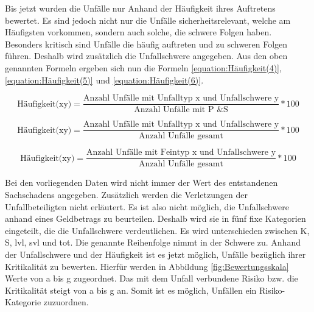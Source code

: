 Bis jetzt wurden die Unfälle nur Anhand der Häufigkeit ihres Auftretens bewertet. Es sind jedoch nicht nur die Unfälle sicherheitsrelevant, welche am Häufigsten vorkommen, sondern auch solche, die schwere Folgen haben. Besonders kritisch sind Unfälle die häufig auftreten und zu schweren Folgen führen. Deshalb wird zusätzlich die Unfallschwere angegeben. Aus den oben genannten Formeln ergeben sich nun die Formeln \ref{equation:Häufigkeit(4)}, \ref{equation:Häufigkeit(5)} und \ref{equation:Häufigkeit(6)}.

\begin{equation}\label{equation:Häufigkeit(4)}
\text{Häufigkeit(xy)} = \dfrac{\text{Anzahl Unfälle mit Unfalltyp x und Unfallschwere y}}{\text{Anzahl Unfälle mit P \& S}}*100
\end{equation}

\begin{equation}\label{equation:Häufigkeit(5)}
\text{Häufigkeit(xy)} = \dfrac{\text{Anzahl Unfälle mit Unfalltyp x und Unfallschwere y}}{\text{Anzahl Unfälle gesamt}}*100
\end{equation}

\begin{equation}\label{equation:Häufigkeit(6)}
\text{Häufigkeit(xy)} = \dfrac{\text{Anzahl Unfälle mit Feintyp x und Unfallschwere y}}{\text{Anzahl Unfälle gesamt}}*100
\end{equation}

Bei den vorliegenden Daten wird nicht immer der Wert des entstandenen Sachschadens angegeben. Zusätzlich werden die Verletzungen der Unfallbeteiligten nicht erläutert. Es ist also nicht möglich, die Unfallschwere anhand eines Geldbetrags zu beurteilen. Deshalb wird sie in fünf fixe Kategorien eingeteilt, die die Unfallschwere verdeutlichen. Es wird unterschieden zwischen \ac{K}, \ac{S}, \ac{lvl}, \ac{svl} und \ac{tot}. Die genannte Reihenfolge nimmt in der Schwere zu. Anhand der Unfallschwere und der Häufigkeit ist es jetzt möglich, Unfälle bezüglich ihrer Kritikalität zu bewerten. Hierfür werden in Abbildung \ref{fig:Bewertungsskala} Werte von a bis g zugeordnet. Das mit dem Unfall verbundene Risiko bzw. die Kritikalität steigt von a bis g an. Somit ist es möglich, Unfällen ein Risiko-Kategorie zuzuordnen.

